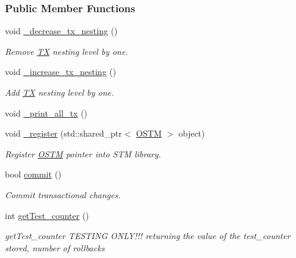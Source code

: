 \subsubsection*{Public Member Functions}
\begin{DoxyCompactItemize}
\item 
void \hyperlink{class_t_x_aa3ac499f576326588628ade96b27b4b1_aa3ac499f576326588628ade96b27b4b1}{\+\_\+decrease\+\_\+tx\+\_\+nesting} ()
\begin{DoxyCompactList}\small\item\em Remove \hyperlink{class_t_x}{TX} nesting level by one. \end{DoxyCompactList}\item 
void \hyperlink{class_t_x_a1384bdf12d795854b5d32e7f61ffbdb8_a1384bdf12d795854b5d32e7f61ffbdb8}{\+\_\+increase\+\_\+tx\+\_\+nesting} ()
\begin{DoxyCompactList}\small\item\em Add \hyperlink{class_t_x}{TX} nesting level by one. \end{DoxyCompactList}\item 
void \hyperlink{class_t_x_a3d96ed91eb9ec73e16589f705661c5a7_a3d96ed91eb9ec73e16589f705661c5a7}{\+\_\+print\+\_\+all\+\_\+tx} ()
\item 
void \hyperlink{class_t_x_abc32af2f51df97ac483e5bfe7db6ca6e_abc32af2f51df97ac483e5bfe7db6ca6e}{\+\_\+register} (std\+::shared\+\_\+ptr$<$ \hyperlink{class_o_s_t_m}{O\+S\+TM} $>$ object)
\begin{DoxyCompactList}\small\item\em Register \hyperlink{class_o_s_t_m}{O\+S\+TM} pointer into S\+TM library. \end{DoxyCompactList}\item 
bool \hyperlink{class_t_x_a9dde5d356b35e557448e58d260087356_a9dde5d356b35e557448e58d260087356}{commit} ()
\begin{DoxyCompactList}\small\item\em Commit transactional changes. \end{DoxyCompactList}\item 
int \hyperlink{class_t_x_ae9bf97930c4670f59d334b345353a71e_ae9bf97930c4670f59d334b345353a71e}{get\+Test\+\_\+counter} ()
\begin{DoxyCompactList}\small\item\em get\+Test\+\_\+counter T\+E\+S\+T\+I\+NG O\+N\+L\+Y!!! returning the value of the test\+\_\+counter stored, number of rollbacks \end{DoxyCompactList}\item 

\end{DoxyCompactItemize}
